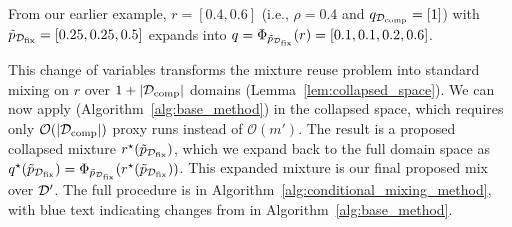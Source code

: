 From our earlier example, $r = [0.4, 0.6]$ (i.e., $\rho = 0.4$ and $q_{\mathcal{D}_{\text{comp}}} = [1]$) with $\tilde{p}_{\mathcal{D}_{\text{fix}}} = [0.25, 0.25, 0.5]$ expands into $q = \Phi_{\tilde{p}_{\mathcal{D}_{\text{fix}}}}(r) = [0.1, 0.1, 0.2, 0.6]$.

This change of variables transforms the mixture reuse problem into standard mixing on $r$ over $1 + |\mathcal{D}_{\text{comp}}|$ domains (Lemma~\ref{lem:collapsed_space}). We can now apply \base (Algorithm~\ref{alg:base_method}) in the collapsed space, which requires only $\mathcal{O}(|\mathcal{D}_{\text{comp}}|)$ proxy runs instead of $\mathcal{O}(m')$. 
The result is a proposed collapsed mixture $r^\star(\tilde{p}_{\mathcal{D}_{\text{fix}}})$, which we expand back to the full domain space as $q^\star(\tilde{p}_{\mathcal{D}_{\text{fix}}}) = \Phi_{\tilde{p}_{\mathcal{D}_{\text{fix}}}}(r^\star(\tilde{p}_{\mathcal{D}_{\text{fix}}}))$. This expanded mixture is our final proposed mix over $\mathcal{D}'$. The full procedure is in Algorithm~\ref{alg:conditional_mixing_method}, with \textcolor{olmoBlue}{blue} text indicating changes from \base in Algorithm~\ref{alg:base_method}.


